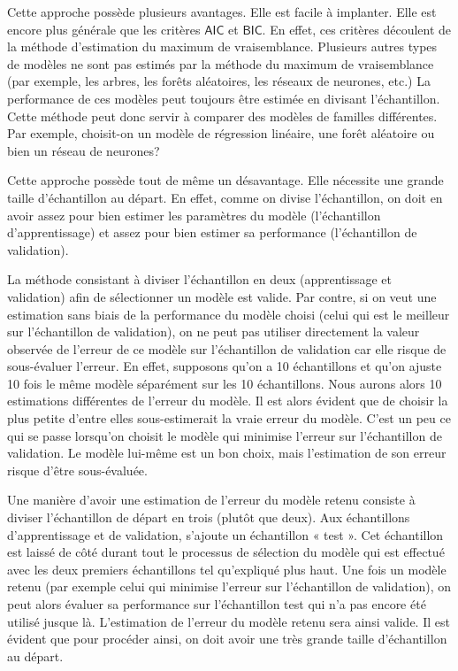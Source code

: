 \documentclass[
  11pt,
  letterpaper,
]{book}
\theoremstyle{definition}
\theoremstyle{definition}
\theoremstyle{definition}
\theoremstyle{definition}
\theoremstyle{remark}
\begin{document}
Cette approche possède plusieurs avantages. Elle est facile à implanter. Elle est encore plus générale que les critères \(\mathsf{AIC}\) et \(\mathsf{BIC}\). En effet, ces critères découlent de la méthode d'estimation du maximum de vraisemblance. Plusieurs autres types de modèles ne sont pas estimés par la méthode du maximum de vraisemblance (par exemple, les arbres, les forêts aléatoires, les réseaux de neurones, etc.) La performance de ces modèles peut toujours être estimée en divisant l'échantillon. Cette méthode peut donc servir à comparer des modèles de familles différentes. Par exemple, choisit-on un modèle de régression linéaire, une forêt aléatoire ou bien un réseau de neurones?

Cette approche possède tout de même un désavantage. Elle nécessite une grande taille d'échantillon au départ. En effet, comme on divise l'échantillon, on doit en avoir assez pour bien estimer les paramètres du modèle (l'échantillon d'apprentissage) et assez pour bien estimer sa performance (l'échantillon de validation).

La méthode consistant à diviser l'échantillon en deux (apprentissage et validation) afin de sélectionner un modèle est valide. Par contre, si on veut une estimation sans biais de la performance du modèle choisi (celui qui est le meilleur sur l'échantillon de validation), on ne peut pas utiliser directement la valeur observée de l'erreur de ce modèle sur l'échantillon de validation car elle risque de sous-évaluer l'erreur. En effet, supposons qu'on a 10 échantillons et qu'on ajuste 10 fois le même modèle séparément sur les 10 échantillons. Nous aurons alors 10 estimations différentes de l'erreur du modèle. Il est alors évident que de choisir la plus petite d'entre elles sous-estimerait la vraie erreur du modèle. C'est un peu ce qui se passe lorsqu'on choisit le modèle qui minimise l'erreur sur l'échantillon de validation. Le modèle lui-même est un bon choix, mais l'estimation de son erreur risque d'être sous-évaluée.

Une manière d'avoir une estimation de l'erreur du modèle retenu consiste à diviser l'échantillon de départ en trois (plutôt que deux). Aux échantillons d'apprentissage et de validation, s'ajoute un échantillon « test ». Cet échantillon est laissé de côté durant tout le processus de sélection du modèle qui est effectué avec les deux premiers échantillons tel qu'expliqué plus haut. Une fois un modèle retenu (par exemple celui qui minimise l'erreur sur l'échantillon de validation), on peut alors évaluer sa performance sur l'échantillon test qui n'a pas encore été utilisé jusque là. L'estimation de l'erreur du modèle retenu sera ainsi valide. Il est évident que pour procéder ainsi, on doit avoir une très grande taille d'échantillon au départ.
\end{document}
